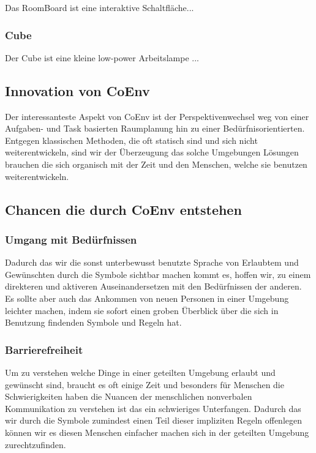 \documentclass{article}
\begin{document}
Das RoomBoard ist eine interaktive Schaltfläche...

\subsubsection*{Cube}

Der Cube ist eine kleine low-power Arbeitslampe ...

\subsection{Innovation von CoEnv}

Der interessanteste Aspekt von CoEnv ist der Perspektivenwechsel weg von einer Aufgaben- und Task basierten Raumplanung hin zu einer Bedürfnisorientierten. Entgegen klassischen Methoden, die oft statisch sind und sich nicht weiterentwickeln, sind wir der Überzeugung das solche Umgebungen Lösungen brauchen die sich organisch mit der Zeit und den Menschen, welche sie benutzen weiterentwickeln. 

\subsection{Chancen die durch CoEnv entstehen}

\subsubsection*{Umgang mit Bedürfnissen}
Dadurch das wir die sonst unterbewusst benutzte Sprache von Erlaubtem und Gewünschten durch die Symbole sichtbar machen kommt es, hoffen wir, zu einem direkteren und aktiveren Auseinandersetzen mit den Bedürfnissen der anderen. Es sollte aber auch das Ankommen von neuen Personen in einer Umgebung leichter machen, indem sie sofort einen groben Überblick über die sich in Benutzung findenden Symbole und Regeln hat.
\subsubsection*{Barrierefreiheit}
Um zu verstehen welche Dinge in einer geteilten Umgebung erlaubt und gewünscht sind, braucht es oft einige Zeit und besonders für Menschen die Schwierigkeiten haben die Nuancen der menschlichen nonverbalen Kommunikation zu verstehen ist das ein schwieriges Unterfangen. Dadurch das wir durch die Symbole zumindest einen Teil dieser impliziten Regeln offenlegen können wir es diesen Menschen einfacher machen sich in der geteilten Umgebung zurechtzufinden.
\end{document}
